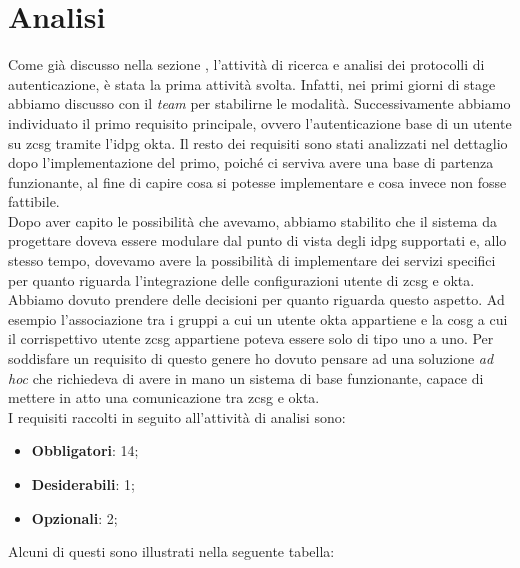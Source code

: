 \section{Analisi}
Come già discusso nella sezione , l'attività di ricerca e analisi dei protocolli di autenticazione, è stata la prima attività svolta. Infatti, nei primi giorni di stage abbiamo discusso con il \textit{team} per stabilirne le modalità. Successivamente abbiamo individuato il primo requisito principale, ovvero l'autenticazione base di un utente su \gls{zcsg} tramite l'\gls{idpg} \gls{okta}. Il resto dei requisiti sono stati analizzati nel dettaglio dopo l'implementazione del primo, poiché ci serviva avere una base di partenza funzionante, al fine di capire cosa si potesse implementare e cosa invece non fosse fattibile. \\
Dopo aver capito le possibilità che avevamo, abbiamo stabilito che il sistema da progettare doveva essere modulare dal punto di vista degli \gls{idpg} supportati e, allo stesso tempo, dovevamo avere la possibilità di implementare dei servizi specifici per quanto riguarda l'integrazione delle configurazioni utente di \gls{zcsg} e \gls{okta}. Abbiamo dovuto prendere delle decisioni per quanto riguarda questo aspetto. Ad esempio l'associazione tra i gruppi a cui un utente \gls{okta} appartiene e la \gls{cosg} a cui il corrispettivo utente \gls{zcsg} appartiene poteva essere solo di tipo uno a uno. Per soddisfare un requisito di questo genere ho dovuto pensare ad una soluzione \textit{ad hoc} che richiedeva di avere in mano un sistema di base funzionante, capace di mettere in atto una comunicazione tra \gls{zcsg} e \gls{okta}. \\
I requisiti raccolti in seguito all'attività di analisi sono:
\begin{itemize}
    \setlength\itemsep{0em}
    \item \textbf{Obbligatori}: 14;
    \item \textbf{Desiderabili}: 1;
    \item \textbf{Opzionali}: 2;
\end{itemize}
 
Alcuni di questi sono illustrati nella seguente tabella:

